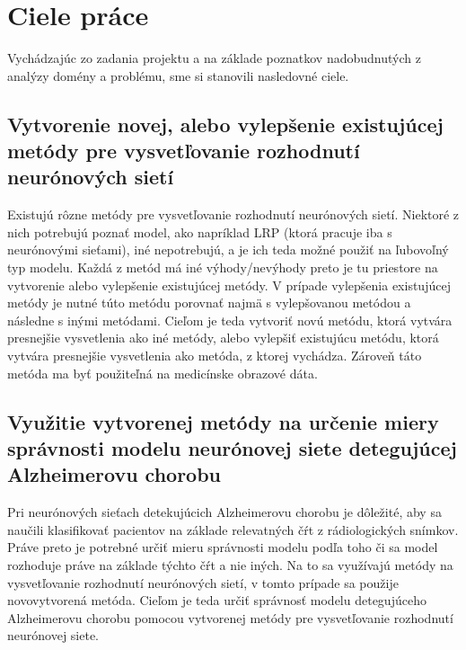 \chapter{Ciele práce \label{sec:goals}}

Vychádzajúc zo zadania projektu a na základe poznatkov nadobudnutých z analýzy domény a problému, sme si stanovili nasledovné ciele.

\section{Vytvorenie novej, alebo vylepšenie existujúcej metódy pre vysvetľovanie rozhodnutí neurónových sietí \label{sec:goals_1}} 

Existujú rôzne metódy pre vysvetľovanie rozhodnutí neurónových sietí. Niektoré z nich potrebujú poznať model, ako napríklad LRP (ktorá pracuje iba s neurónovými sieťami), iné nepotrebujú, a je ich teda možné použiť na ľubovoľný typ modelu. Každá z metód má iné výhody/nevýhody preto je tu priestore na vytvorenie alebo vylepšenie existujúcej metódy. V prípade vylepšenia existujúcej metódy je nutné túto metódu porovnať najmä s vylepšovanou metódou a následne s inými metódami. Cieľom je teda vytvoriť novú metódu, ktorá vytvára presnejšie vysvetlenia ako iné metódy, alebo vylepšiť existujúcu metódu, ktorá vytvára presnejšie vysvetlenia ako metóda, z ktorej vychádza. Zároveň táto metóda ma byť použiteľná na medicínske obrazové dáta.

\section{Využitie vytvorenej metódy na určenie miery správnosti modelu neurónovej siete detegujúcej Alzheimerovu chorobu \label{sec:goals_2}}

Pri neurónových sieťach detekujúcich Alzheimerovu chorobu je dôležité, aby sa naučili klasifikovať pacientov na základe relevatných čŕt z rádiologických snímkov. Práve preto je potrebné určiť mieru správnosti modelu podľa toho či sa model rozhoduje práve na základe týchto čŕt a nie iných. Na to sa využívajú metódy na vysvetľovanie rozhodnutí neurónových sietí, v tomto prípade sa použije novovytvorená metóda. Cieľom je teda určiť správnosť modelu detegujúceho Alzheimerovu chorobu pomocou vytvorenej metódy pre vysvetľovanie rozhodnutí neurónovej siete.
